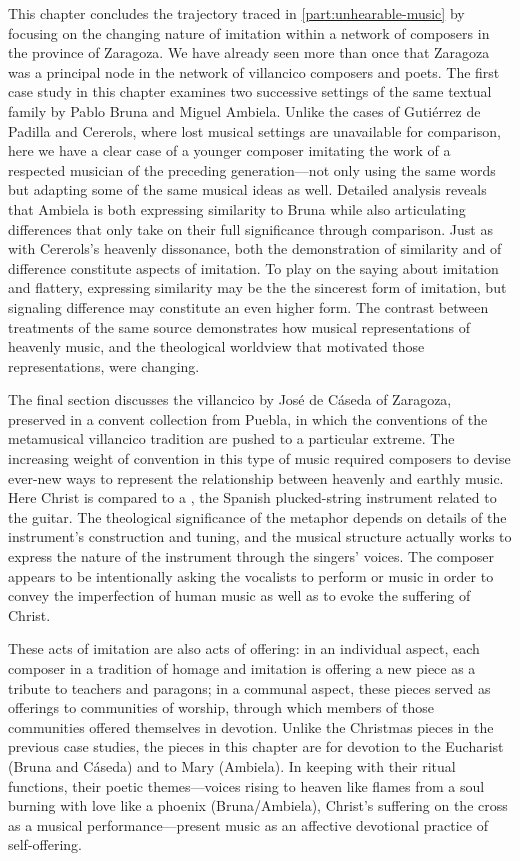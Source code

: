 This chapter concludes the trajectory traced in \cref{part:unhearable-music} by
focusing on the changing nature of imitation within a network of composers in
the province of Zaragoza.
We have already seen more than once that Zaragoza was a principal node in the
network of villancico composers and poets.
The first case study in this chapter examines two successive settings of the
same textual family by Pablo Bruna and Miguel Ambiela.
Unlike the cases of Gutiérrez de Padilla and Cererols, where lost
musical settings are unavailable for comparison, here we have a clear case of a
younger composer imitating the work of a respected musician of the preceding
generation---not only using the same words but adapting some of the same
musical ideas as well.
Detailed analysis reveals that Ambiela is both expressing similarity to Bruna
while also articulating differences that only take on their full significance
through comparison.
Just as with Cererols's heavenly dissonance, both the demonstration of
similarity and of difference constitute aspects of imitation.
To play on the saying about imitation and flattery, expressing similarity may
be the the sincerest form of imitation, but signaling difference may constitute
an even higher form.
The contrast between treatments of the same source demonstrates how musical
representations of heavenly music, and the theological worldview that motivated
those representations, were changing.  

The final section discusses the villancico  by José
de Cáseda of Zaragoza, preserved in a convent collection from Puebla, in which
the conventions of the metamusical villancico tradition are pushed to a
particular extreme.
The increasing weight of convention in this type of music required composers to
devise ever-new ways to represent the relationship between heavenly and earthly
music.
Here Christ is compared to a , the Spanish plucked-string
instrument related to the guitar.
The theological significance of the metaphor depends on details of the
instrument's construction and tuning, and the musical structure actually works
to express the nature of the instrument through the singers' voices.
The composer appears to be intentionally asking the vocalists to perform
 or  music in order to convey the imperfection of
human music as well as to evoke the suffering of Christ.

These acts of imitation are also acts of offering: in an individual aspect,
each composer in a tradition of homage and imitation is offering a new piece as
a tribute to teachers and paragons; in a communal aspect, these pieces served
as offerings to communities of worship, through which members of those
communities offered themselves in devotion. 
Unlike the Christmas pieces in the previous case studies, the pieces in this
chapter are for devotion to the Eucharist (Bruna and Cáseda) and to Mary
(Ambiela).  
In keeping with their ritual functions, their poetic themes---voices rising to
heaven like flames from a soul burning with love like a phoenix
(Bruna/Ambiela), Christ's suffering on the cross as a musical
performance---present music as an affective devotional practice of
self-offering.

